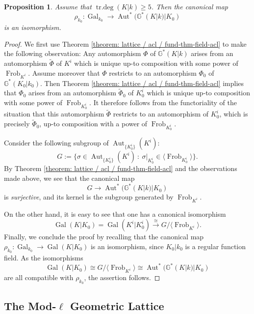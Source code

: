 \documentclass[11pt]{amsart}
\newtheorem{proposition}{Proposition}[section]
\theoremstyle{definition}
\theoremstyle{remark}
\numberwithin{equation}{section}
\DeclareMathOperator{\Aut}{Aut}
\DeclareMathOperator{\Gal}{Gal}
\DeclareMathOperator{\trdeg}{tr.deg}
\newcommand{\G}{\mathbb{G}}
\newcommand{\Frob}{\operatorname{Frob}}
\newcommand{\Galk}{{\Gal_{k_0}}}
\begin{document}
\begin{proposition}
\label{proposition: lattice / galois-acl / galois-acl}
  Assume that $\trdeg(K|k) \geq 5$.
  Then the canonical map 
  \[ \rho_{k_0} : \Galk \rightarrow \Aut^*(\G^*(K|k)|K_0) \]
  is an isomorphism.
\end{proposition}
\begin{proof}
  We first use Theorem \ref{theorem: lattice / acl / fund-thm-field-acl} to make the following observation:
  Any automorphism $\Phi$ of $\G^*(K|k)$ arises from an automorphism $\tilde\Phi$ of $K^i$ which is unique up-to composition with some power of $\Frob_{K^i}$.
  Assume moreover that $\Phi$ restricts to an automorphism $\Phi_0$ of $\G^*(K_0|k_0)$.
  Then Theorem \ref{theorem: lattice / acl / fund-thm-field-acl} implies that $\Phi_0$ arises from an automorphism $\tilde\Phi_0$  of $K_0^i$ which is unique up-to composition with some power of $\Frob_{K_0^i}$.
  It therefore follows from the functoriality of the situation that this automorphism $\tilde\Phi$ restricts to an automorphism of $K_0^i$, which is precisely $\tilde\Phi_0$, up-to composition with a power of $\Frob_{K_0^i}$.

  Consider the following subgroup of $\Aut_{\{K_0^i\}}(K^i)$:
  \[ G:= \{\sigma \in \Aut_{\{K_0^i\}}(K^i) \ : \ \sigma|_{K_0^i} \in \langle \Frob_{K_0^i} \rangle \}.\]
  By Theorem \ref{theorem: lattice / acl / fund-thm-field-acl} and the observations made above, we see that the canonical map
  \[ G \rightarrow \Aut^*(\G^*(K|k)|K_0) \]
  is \emph{surjective}, and its kernel is the subgroup generated by $\Frob_{K^i}$.

  On the other hand, it is easy to see that one has a canonical isomorphism
  \[ \Gal(K|K_0) = \Gal(K^i|K_0^i) \xrightarrow{\cong} G/\langle \Frob_{K^i} \rangle. \]
  Finally, we conclude the proof by recalling that the canonical map $\rho_{k_0} : \Galk \rightarrow \Gal(K|K_0)$ is an isomorphism, since $K_0|k_0$ is a regular function field.
  As the isomorphisms 
  \[ \Gal(K|K_0) \cong G/\langle \Frob_{K^i} \rangle \cong \Aut^*(\G^*(K|k)|K_0) \]
  are all compatible with $\rho_{k_0}$, the assertion follows.
\end{proof}

\subsection{The Mod-$\ell$ Geometric Lattice}
\label{subsection: lattice / mod-ell}
\end{document}
